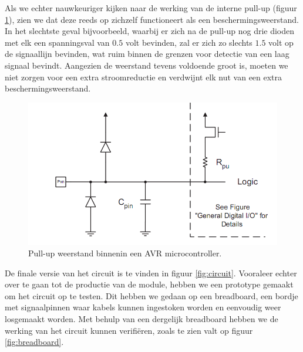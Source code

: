 Als we echter nauwkeuriger kijken naar de werking van de interne pull-up (figuur \ref{fig:avr_pullup}), zien we dat deze reeds op zichzelf functioneert als een beschermingsweerstand. In het slechtste geval bijvoorbeeld, waarbij er zich na de pull-up nog drie dioden met elk een spanningsval van $0.5$ volt bevinden, zal er zich zo slechts $1.5$ volt op de signaallijn bevinden, wat ruim binnen de grenzen voor detectie van een laag signaal bevindt. Aangezien de weerstand tevens voldoende groot is, moeten we niet zorgen voor een extra stroomreductie en verdwijnt elk nut van een extra beschermingsweerstand.

\begin{figure}
	\includegraphics[width=\textwidth]{afbeeldingen/inputmodule_pullup}
	\caption{Pull-up weerstand binnenin een AVR microcontroller.}
	\label{fig:avr_pullup}
\end{figure}

De finale versie van het circuit is te vinden in figuur \ref{fig:circuit}. Vooraleer echter over te gaan tot de productie van de module, hebben we een prototype gemaakt om het circuit op te testen. Dit hebben we gedaan op een breadboard, een bordje met signaalpinnen waar kabels kunnen ingestoken worden en eenvoudig weer losgemaakt worden. Met behulp van een dergelijk breadboard hebben we de werking van het circuit kunnen verifiëren, zoals te zien valt op figuur \ref{fig:breadboard}.

